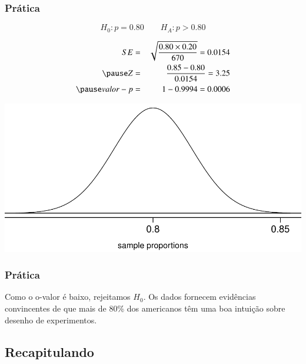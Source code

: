 \begin{frame}
\frametitle{Prática}


\pause 

\[ H_0: p = 0.80 \qquad H_A: p > 0.80 \]

{
\pause
\begin{eqnarray*}
SE &=& \sqrt{\frac{0.80 \times 0.20}{670}} = 0.0154 \\
\pause
Z &=& \frac{0.85 - 0.80}{0.0154} = 3.25 \\
\pause
valor-p &=& 1 - 0.9994 = 0.0006 \\
\end{eqnarray*}
}
{
\begin{center}
\includegraphics[width=\textwidth]{6-1_single_prop/expdesgn_norm.pdf}
\end{center}
}
\end{frame}

\begin{frame}
\frametitle{Prática}

\justifying
Como o o-valor é baixo, rejeitamos $H_0$. Os dados fornecem evidências convincentes de que mais de 80\% dos americanos têm uma boa intuição sobre desenho de experimentos.

\end{frame}


\subsection{Recapitulando}

